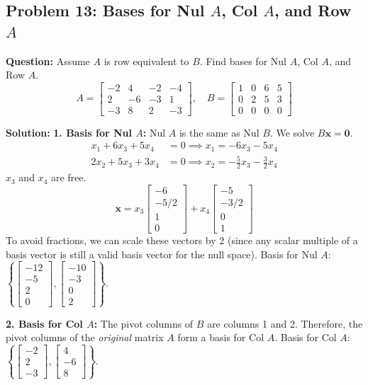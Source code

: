 \documentclass[12pt]{article}
\begin{document}
\subsection{Problem 13: Bases for Nul $A$, Col $A$, and Row $A$}
\textbf{Question:} Assume $A$ is row equivalent to $B$. Find bases for Nul $A$, Col $A$, and Row $A$.
\[ A = \begin{bmatrix} -2 & 4 & -2 & -4 \\ 2 & -6 & -3 & 1 \\ -3 & 8 & 2 & -3 \end{bmatrix}, \quad B = \begin{bmatrix} 1 & 0 & 6 & 5 \\ 0 & 2 & 5 & 3 \\ 0 & 0 & 0 & 0 \end{bmatrix} \]

\textbf{Solution:}
\textbf{1. Basis for Nul $A$:}
Nul $A$ is the same as Nul $B$. We solve $B\mathbf{x} = \mathbf{0}$.
\begin{align*}
x_1 + 6x_3 + 5x_4 &= 0 \implies x_1 = -6x_3 - 5x_4 \\
2x_2 + 5x_3 + 3x_4 &= 0 \implies x_2 = -\frac{5}{2}x_3 - \frac{3}{2}x_4
\end{align*}
$x_3$ and $x_4$ are free.
\[ \mathbf{x} = x_3 \begin{bmatrix} -6 \\ -5/2 \\ 1 \\ 0 \end{bmatrix} + x_4 \begin{bmatrix} -5 \\ -3/2 \\ 0 \\ 1 \end{bmatrix} \]
To avoid fractions, we can scale these vectors by 2 (since any scalar multiple of a basis vector is still a valid basis vector for the null space).
Basis for Nul $A$: $\left\{ \begin{bmatrix} -12 \\ -5 \\ 2 \\ 0 \end{bmatrix}, \begin{bmatrix} -10 \\ -3 \\ 0 \\ 2 \end{bmatrix} \right\}$.

\textbf{2. Basis for Col $A$:}
The pivot columns of $B$ are columns 1 and 2. Therefore, the pivot columns of the \textit{original} matrix $A$ form a basis for Col $A$.
Basis for Col $A$: $\left\{ \begin{bmatrix} -2 \\ 2 \\ -3 \end{bmatrix}, \begin{bmatrix} 4 \\ -6 \\ 8 \end{bmatrix} \right\}$.
\end{document}
